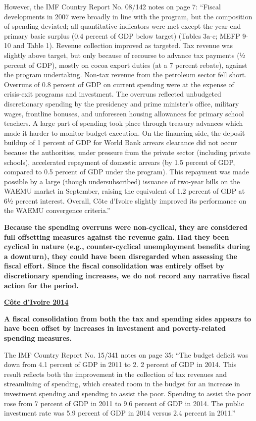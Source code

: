 However, the IMF Country Report No. 08/142 notes on page 7: “Fiscal developments in 2007 were broadly in line with the program, but the composition of spending deviated; all quantitative indicators were met except the year-end primary basic surplus (0.4 percent of GDP below target) (Tables 3a-c; MEFP 9-10 and Table 1). Revenue collection improved as targeted. Tax revenue was slightly above target, but only because of recourse to advance tax payments (½ percent of GDP), mostly on cocoa export duties (at a 7 percent rebate), against the program undertaking. Non-tax revenue from the petroleum sector fell short. Overruns of 0.8 percent of GDP on current spending were at the expense of crisis-exit programs and investment. The overruns reflected unbudgeted discretionary spending by the presidency and prime minister’s office, military wages, frontline bonuses, and unforeseen housing allowances for primary school teachers. A large part of spending took place through treasury advances which made it harder to monitor budget execution. On the financing side, the deposit buildup of 1 percent of GDP for World Bank arrears clearance did not occur because the authorities, under pressure from the private sector (including private schools), accelerated repayment of domestic arrears (by 1.5 percent of GDP, compared to 0.5 percent of GDP under the program). This repayment was made possible by a large (though undersubscribed) issuance of two-year bills on the WAEMU market in September, raising the equivalent of 1.2 percent of GDP at 6½ percent interest. Overall, Côte d’Ivoire slightly improved its performance on the WAEMU convergence criteria.”

\textbf{Because the spending overruns were non-cyclical, they are considered full offsetting measures against the revenue gain. Had they been cyclical in nature (e.g., counter-cyclical unemployment benefits during a downturn), they could have been disregarded when assessing the fiscal effort. Since the fiscal consolidation was entirely offset by discretionary spending increases, we do not record any narrative fiscal action for the period.}

\textbf{\underline{Côte d'Ivoire 2014}}

\textbf{A fiscal consolidation from both the tax and spending sides appears to have been offset by increases in investment and poverty-related spending measures.}

The IMF Country Report No. 15/341 notes on page 35: “The budget deficit was down from 4.1 percent of GDP in 2011 to 2. 2 percent of GDP in 2014. This result reflects both the improvement in the collection of tax revenues and streamlining of spending, which created room in the budget for an increase in investment spending and spending to assist the poor. Spending to assist the poor rose from 7 percent of GDP in 2011 to 9.6 percent of GDP in 2014. The public investment rate was 5.9 percent of GDP in 2014 versus 2.4 percent in 2011.”

